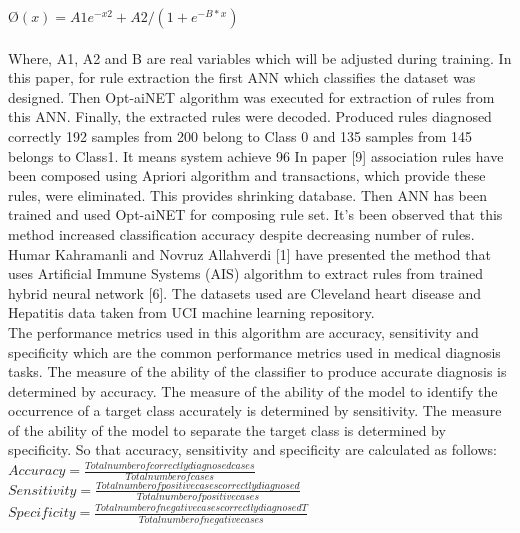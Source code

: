 \documentclass[a4paper,14pt,onecolumn]{article}
\begin{document}
$Ø(x) ={A1e^{- x2}+A2}/{(1+e^{-B*x})}$\\
\\
Where, A1, A2 and B are real variables which will be adjusted during training.
     In this paper, for rule extraction the first ANN which classifies the dataset was designed. Then Opt-aiNET algorithm was executed for extraction of rules from this ANN. Finally, the extracted rules were decoded. Produced rules diagnosed correctly 192 samples from 200 belong to Class 0 and 135 samples from 145 belongs to Class1. It means system achieve 96%
     In paper [9] association rules have been composed using Apriori algorithm and transactions, which provide these rules, were eliminated. This provides shrinking database. Then ANN has been trained and used Opt-aiNET for composing rule set. It’s been observed that this method increased classification accuracy despite decreasing number of rules.\\ 
     Humar Kahramanli and  Novruz Allahverdi [1] have presented the method that uses Artificial Immune Systems (AIS) algorithm to extract rules from trained hybrid neural network [6]. The datasets used are Cleveland heart disease and Hepatitis data taken from UCI machine learning repository.\\ 
     The performance metrics used in this algorithm are accuracy, sensitivity and specificity which are the common performance metrics used in medical diagnosis tasks. The measure of the ability of the classifier to produce accurate diagnosis is determined by accuracy. The measure of the ability of the model to identify the occurrence of a target class accurately is determined by sensitivity. The measure of the ability of the model to separate the target class is determined by specificity. So that accuracy, sensitivity and specificity are calculated as follows:\\


$Accuracy=\frac{Total number of correctly diagnosed cases}{Total number of cases}$\\[4mm]

$Sensitivity=\frac{Total number of positive cases correctly diagnosed}{Total number of positive cases }$\\[4mm]

$Specificity=\frac{Total number of negative cases correctly diagnosedT}{Total number of negative cases}$\\[4mm]
\end{document}
